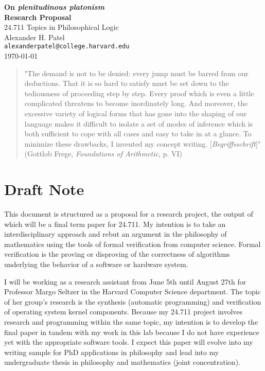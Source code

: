 \documentclass[12pt]{article}
\theoremstyle{definition}
\begin{document}
\begin{center}
\textbf{On \textit{plenitudinous platonism}} \\
\textbf{Research Proposal} \\
24.711 Topics in Philosophical Logic \\
Alexander H. Patel \\
{\tt alexanderpatel@college.harvard.edu} \\
\today
\end{center}

\begin{quotation}
"The demand is not to be denied: every jump must be barred from our deductions.
That it is so hard to satisfy must be set down to the tediousness of proceeding
step by step. Every proof which is even a little complicated threatens to
become inordinately long. And moreover, the excessive variety of logical forms
that has gone into the shaping of our language makes it difficult to isolate a
set of modes of inference which is both sufficient to cope with all cases and
easy to take in at a glance. To minimize these drawbacks, I invented my concept
writing. [\textit{Begriffsschrift}]" (Gottlob Frege, \textit{Foundations of
Arithmetic}, p. VI)
\end{quotation}


\tableofcontents

\section{Draft Note}

This document is structured as a proposal for a research project, the output of
which will be a final term paper for 24.711. My intention is to take an
interdisciplinary approach and rebut an argument in the philosophy of
mathematics using the tools of formal verification from computer science.
Formal verification is the proving or disproving of the correctness of
algorithms underlying the behavior of a software or hardware system.

I will be working as a research assistant from June 5th until August 27th for
Professor Margo Seltzer in the Harvard Computer Science department. The topic
of her group's research is the synthesis (automatic programming) and
verification of operating system kernel components. Because my 24.711 project
involves research and programming within the same topic, my intention is to
develop the final paper in tandem with my work in this lab because I do not
have experience yet with the appropriate software tools. I expect this paper
will evolve into my writing sample for PhD applications in philosophy and lead
into my undergraduate thesis in philosophy and mathematics (joint
concentration).
\end{document}
